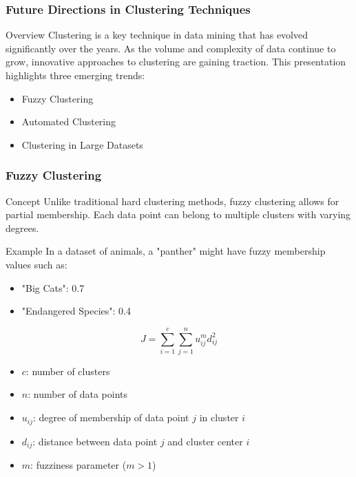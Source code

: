\documentclass[aspectratio=169]{beamer}
\begin{document}
\begin{frame}[fragile]
    \frametitle{Future Directions in Clustering Techniques}
    \begin{block}{Overview}
        Clustering is a key technique in data mining that has evolved significantly over the years. As the volume and complexity of data continue to grow, innovative approaches to clustering are gaining traction. 
        This presentation highlights three emerging trends: 
        \begin{itemize}
            \item Fuzzy Clustering
            \item Automated Clustering
            \item Clustering in Large Datasets
        \end{itemize}
    \end{block}
\end{frame}

\begin{frame}[fragile]
    \frametitle{Fuzzy Clustering}
    \begin{block}{Concept}
        Unlike traditional hard clustering methods, fuzzy clustering allows for partial membership. Each data point can belong to multiple clusters with varying degrees.
    \end{block}
    
    \begin{block}{Example}
        In a dataset of animals, a "panther" might have fuzzy membership values such as:
        \begin{itemize}
            \item "Big Cats": 0.7
            \item "Endangered Species": 0.4
        \end{itemize}
    \end{block}

    \begin{equation}
        J = \sum_{i=1}^{c} \sum_{j=1}^{n} u_{ij}^m d_{ij}^2
    \end{equation}
    \begin{itemize}
        \item $c$: number of clusters
        \item $n$: number of data points
        \item $u_{ij}$: degree of membership of data point $j$ in cluster $i$
        \item $d_{ij}$: distance between data point $j$ and cluster center $i$
        \item $m$: fuzziness parameter ($m > 1$)
    \end{itemize}
\end{frame}
\end{document}
